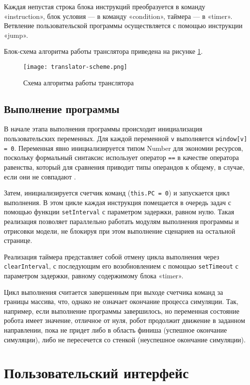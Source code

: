 Каждая непустая строка блока инструкций преобразуется в команду «instruction», блок условия — в команду «condition», таймера — в «timer». Ветвление пользовательской программы осуществляется с помощью инструкции «jump».

Блок-схема алгоритма работы транслятора приведена на рисунке \ref{fig:translator-scheme}.

\begin{figure}[htbp]
	\centering
	\texttt{[image: translator-scheme.png]}
	\caption{Схема алгоритма работы транслятора}%
	\label{fig:translator-scheme}
\end{figure}

\subsection{Выполнение программы}

В начале этапа выполнения программы происходит инициализация пользовательских переменных. Для каждой переменной \lstinline|v| выполняется \lstinline|window[v] = 0|. Переменная явно инициализируется типом Number для экономии ресурсов, поскольку формальный синтаксис использует оператор \lstinline|==| в качестве оператора равенства, который для сравнения приводит типы операндов к общему, в случае, если они не совпадают \cite{mdn-sameness}.

Затем, инициализируется счетчик команд (\lstinline|this.PC = 0|) и запускается цикл выполнения. В этом цикле каждая инструкция помещается в очередь задач с помощью  функции \lstinline|setInterval| с параметром задержки, равном нулю. Такая реализация позволяет параллельно работать модулям выполнения программы и отрисовки модели, не блокируя при этом выполнение сценариев на остальной странице.

Реализация таймера представляет собой отмену цикла выполнения через \lstinline|clearInterval|, с последующим его возобновлением с помощью \lstinline|setTimeout| с параметром задержки, равному содержимому блока «timer».

Цикл выполнения считается завершенным при выходе счетчика команд за границы массива, что, однако не означает окончание процесса симуляции. Так, например, если выполнение программы завершилось, но переменная состояние робота имеет значение, отличное от нуля, робот продолжит движение в заданном направлении, пока не придет либо в область финиша (успешное окончание симуляции), либо не пересечется со стенкой (неуспешное окончание симуляции).

 
\section{Пользовательский интерфейс}

